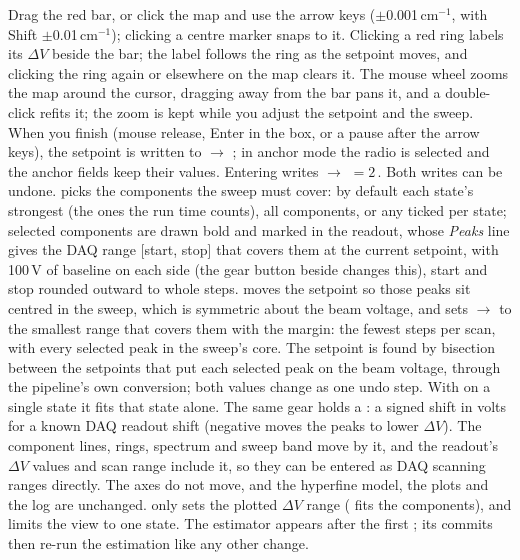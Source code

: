 Drag the red bar, or click the map and use the arrow keys
($\pm$0.001\,cm$^{-1}$, with Shift $\pm$0.01\,cm$^{-1}$); clicking a
centre marker snaps to it. Clicking a red ring labels its $\Delta V$
beside the bar; the label follows the ring as the setpoint moves, and
clicking the ring again or elsewhere on the map clears it. The mouse
wheel zooms the map around the
cursor, dragging away from the bar pans it, and a double-click refits
it; the zoom is kept while you adjust the setpoint and the sweep. When you finish (mouse release, Enter in the
 box, or a pause after the arrow keys), the setpoint is
written to  $\rightarrow$ ; in anchor mode the
 radio is selected and the anchor fields keep their
values. Entering  writes  $\rightarrow$
 $= 2\,$. Both writes can be undone.
 picks the components the sweep must cover: by default
each state's strongest  (the ones the run time
counts), all components, or any ticked per state; selected components
are drawn bold and marked in the readout, whose \emph{Peaks} line
gives the DAQ range [start, stop] that covers them at the current
setpoint, with 100\,V of baseline on each side (the gear button beside
 changes this), start and stop rounded outward to whole
steps.  moves the setpoint so those peaks sit centred in
the sweep, which is symmetric about the beam voltage, and sets
 $\rightarrow$  to the smallest range that covers
them with the margin: the fewest steps per scan, with every selected peak
in the sweep's core. The setpoint is found by bisection between the
setpoints that put each selected peak on the beam voltage, through the
pipeline's own conversion; both values change as one undo step. With
 on a single state it fits that state alone.
The same gear holds a : a signed shift in volts for
a known DAQ readout shift (negative moves the peaks to lower
$\Delta V$). The component lines, rings, spectrum and sweep band move by
it, and the readout's $\Delta V$ values and scan range include it, so
they can be entered as DAQ scanning ranges directly. The axes do not
move, and the hyperfine model, the plots and the log are unchanged.
 only sets the plotted $\Delta V$ range ( fits
the components), and  limits the view to one state. The
estimator appears after the first ; its commits then re-run
the estimation like any other change.

